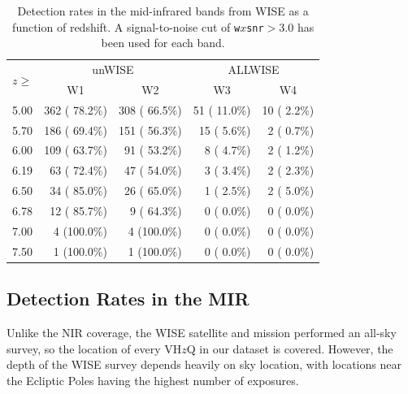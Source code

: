 \documentclass[usenatbib]{mnras}
\begin{document}
  
\begin{table}
  \centering
  \begin{tabular}{l r r r r}
    \hline \hline
    \multirow{ 2}{*}{$z \geq$} & \multicolumn{2}{c}{unWISE} &  \multicolumn{2}{c}{ALLWISE}   \\ 
                                             & \multicolumn{1}{c}{W1} & \multicolumn{1}{c}{W2} & \multicolumn{1}{c}{W3} & \multicolumn{1}{c}{W4}  \\ 
    \hline
    5.00   &   362 ( 78.2\%)   &   308 ( 66.5\%)  &    51 ( 11.0\%)  &    10 (  2.2\%) \\ 
    5.70   &   186 ( 69.4\%)   &   151 ( 56.3\%)  &    15 (  5.6\%)  &     2 (  0.7\%) \\ 
    6.00   &   109 ( 63.7\%)   &    91 ( 53.2\%)  &     8 (  4.7\%)  &     2 (  1.2\%) \\ 
    6.19   &    63 ( 72.4\%)   &    47 ( 54.0\%)  &     3 (  3.4\%)  &     2 (  2.3\%) \\ 
    6.50   &    34 ( 85.0\%)   &    26 ( 65.0\%)  &     1 (  2.5\%)  &     2 (  5.0\%) \\ 
    6.78   &    12 ( 85.7\%)   &     9 ( 64.3\%)  &     0 (  0.0\%)  &     0 (  0.0\%) \\ 
    7.00   &     4 (100.0\%)   &     4 (100.0\%)  &     0 (  0.0\%)  &     0 (  0.0\%) \\ 
    7.50   &     1 (100.0\%)   &     1 (100.0\%)  &     0 (  0.0\%)  &     0 (  0.0\%) \\ 
    \hline \hline
  \end{tabular}
  \caption{Detection rates in the mid-infrared bands from WISE as a function of 
    redshift. A signal-to-noise cut of {\tt w$x$snr}$>3.0$ has been used for each band.}
  \label{tab:mir_detection}
\end{table}

\subsection{Detection Rates in the MIR}
Unlike the NIR coverage, the WISE satellite and mission performed an all-sky survey, so the location of every VH$z$Q in our dataset is covered. However, the depth of the WISE survey depends heavily on sky location, with locations near the Ecliptic Poles having the highest number of exposures.
\end{document}
